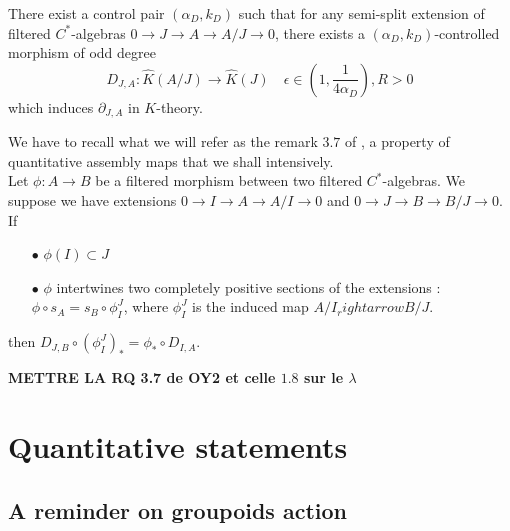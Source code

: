 \begin{prop}
There exist a control pair $(\alpha_D,k_D)$ such that for any semi-split extension of filtered $C^*$-algebras $0\rightarrow J \rightarrow A\rightarrow A/J\rightarrow 0$, there exists a $(\alpha_D,k_D)$-controlled morphism of odd degree
\[D_{J,A} : \hat K(A/J)\rightarrow \hat K(J)\quad \epsilon \in (1,\frac{1}{4\alpha_D}),R>0\]
which induces $\partial_{J,A}$ in $K$-theory.
\end{prop}

We have to recall what we will refer as the remark $3.7$ of \cite{OY2}, a property of quantitative assembly maps that we shall intensively.\\
Let $\phi: A \rightarrow B$ be a filtered morphism between two filtered $C^*$-algebras. We suppose we have extensions $0\rightarrow I \rightarrow A\rightarrow A/I\rightarrow 0$ and $0\rightarrow J \rightarrow B\rightarrow B/J\rightarrow 0$. If 
\begin{itemize}
\item[$\bullet$]$\phi(I)\subset J$
\item[$\bullet$]$\phi$ intertwines two completely positive sections of the extensions : $\phi \circ s_A = s_B \circ \phi_{I}^J$, where $\phi_{I}^J$ is the induced map $A/I_rightarrow B/J$.
\end{itemize} 
then $D_{J,B}\circ (\phi_{I}^J)_*=\phi_*\circ D_{I,A}$.

\textbf{METTRE LA RQ 3.7 de OY2 et celle $1.8$ sur le $\lambda$}



\section{Quantitative statements}

\subsection{A reminder on groupoids action}


